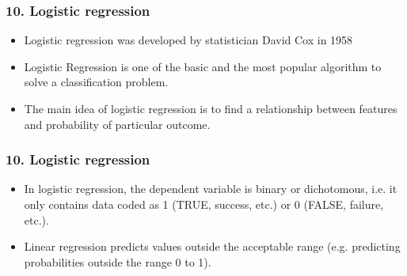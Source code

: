 \documentclass[handout,compress]{beamer} %
\begin{document}
\begin{frame}[allowframebreaks]
\frametitle{10. Logistic regression}
\begin{itemize}
	\item 
	Logistic regression was developed by statistician David Cox in 1958 
	\item 
	Logistic Regression is one of the basic and the most popular algorithm to solve a classification problem.
	\item 
	The main idea of logistic regression is to find a relationship between features and probability of particular outcome.
\end{itemize}
\end{frame}

\begin{frame}[allowframebreaks]
\frametitle{10. Logistic regression}
\begin{itemize}
	\item 
	In logistic regression, the dependent variable is binary or dichotomous, i.e. it only contains data coded as 1 (TRUE, success, etc.) or 0 (FALSE, failure, etc.).
	\item
	Linear regression predicts values outside the acceptable range (e.g. predicting probabilities
	outside the range 0 to 1).
	
\end{itemize}
\end{frame}
\end{document}
